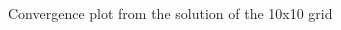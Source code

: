 \documentclass[]{aiaa-tc}%
\begin{document}
\begin{figure}[htb]
\begin{subfigmatrix}{2}
  \end{subfigmatrix}
 \label{f:p_results}
\end{figure}

\begin{figure}[htb]%
  \caption{Convergence plot from the solution of the 10x10 grid}
  \begin{subfigmatrix}{2}
  \end{subfigmatrix}
 \label{f:p_convergeplot}
\end{figure}
\end{document}
